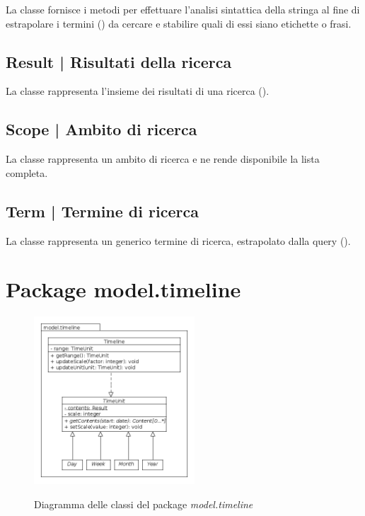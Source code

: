 \documentclass[10pt,a4paper,headinclude,footinclude,hidelinks]{scrreprt} %
\begin{document}
	La classe fornisce i metodi per effettuare l'analisi sintattica della stringa al fine di estrapolare i termini (\textit{}) da cercare e stabilire quali di essi siano etichette o frasi.

	\subsection[Result]{Result | Risultati della ricerca}
	\label{sec:stage:design:model.search:search-result}
	La classe \textit{} rappresenta l'insieme dei risultati di una ricerca (\textit{}).

	\subsection[Scope]{Scope | Ambito di ricerca}
	\label{sec:stage:design:model.search:search-scope}
	La classe \textit{} rappresenta un ambito di ricerca e ne rende disponibile la lista completa.

	\subsection[Term]{Term | Termine di ricerca}
	\label{sec:stage:design:model.search:search-term}
	La classe \textit{} rappresenta un generico termine di ricerca, estrapolato dalla query (\textit{}).

	\section{Package model.timeline}
	\label{sec:stage:design:model.timeline}

	\begin{figure}[ht]
		\begin{center}
	    	\includegraphics[width=6cm]{class/model_timeline.png}
			\label{gfx:class:model:timeline}
			\caption{Diagramma delle classi del package \textit{model.timeline}}
		\end{center}
	\end{figure}
\end{document}
